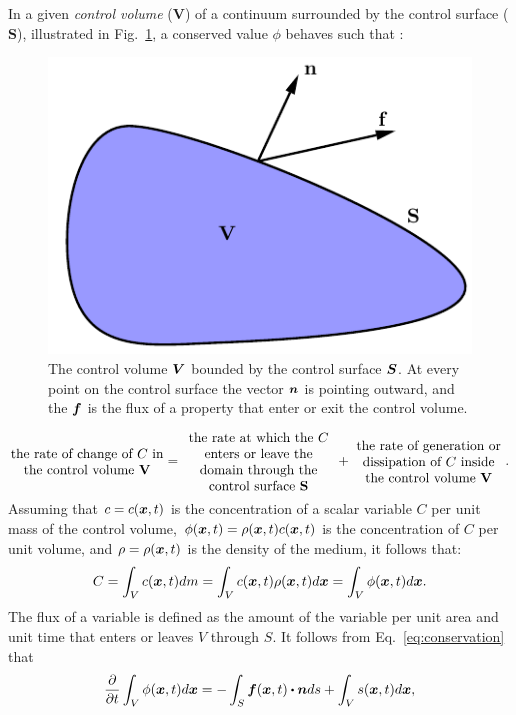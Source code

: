 In a given \textit{control volume} ($\mathbf{V}$) of a continuum surrounded by the control surface ($\mathbf{S}$), illustrated in Fig.~\ref{fig:CV}, a conserved value $\phi$ behaves such that :
\begin{figure}[H]
	\begin{center}
		\includegraphics[width=.4\linewidth]{images/CV.png}
	\end{center}
	\caption{The control volume $\boldsymbol{V}$ bounded by the control surface $\boldsymbol{S}$. At every point on the control surface the vector $\boldsymbol{n}$ is pointing outward, and the $\boldsymbol{f}$ is the flux of a property that enter or exit the control volume.}
	\label{fig:CV}
\end{figure}
\begin{equation}
\parbox{4cm}{\centering the rate of change of $C$  in the control volume $\mathbf{V}$} = 
\parbox{4cm}{\centering the rate at which the $C$ enters or leave the domain through the control surface $\mathbf{S}$ } +
\parbox{4cm}{\centering the rate of generation or dissipation of $C$  inside the control volume $\mathbf{V}$}.  \label{eq:conservation}
\end{equation}
Assuming that $c=c(\boldsymbol{x},t)$ is the concentration of a scalar variable $C$ per unit mass of the control volume, $\phi(\boldsymbol{x},t)=\rho(\boldsymbol{x},t) c(\boldsymbol{x},t) $ is the concentration of $C$ per unit volume, and $\rho=\rho(\boldsymbol{x},t)$ is the density of the medium, it follows that:
\begin{equation}
C=\int_{V} c(\boldsymbol{x},t) dm= \int_{V} c(\boldsymbol{x},t) \rho(\boldsymbol{x},t) d{\boldsymbol{x}} = \int_{V} \phi (\boldsymbol{x},t) d{\boldsymbol{x}} .
\label{eq:Concentration}
\end{equation}
The flux of a variable is defined as the amount of the variable per unit area and unit time that enters or leaves ${V}$ through ${S}$. It follows from Eq.~\ref{eq:conservation} that
\begin{equation}
\frac{\partial}{\partial t} \int_{{V}} \phi (\vect{x},t) d{\vect{x}}= 
- \int_{{S}} \vect{f}(\vect{x},t) \bigcdot \vect{n} ds+
\int_{{V}} s (\vect{x},t) d{\vect{x}},
\label{eq:conservation_integral}
\end{equation}
